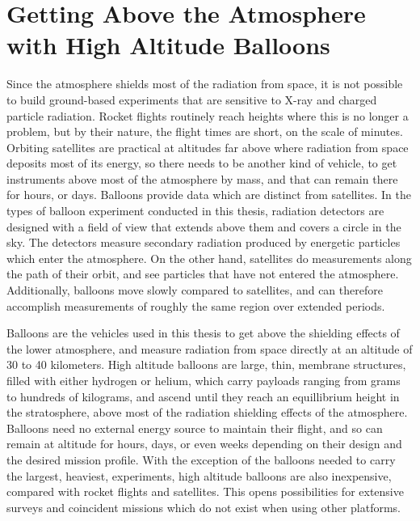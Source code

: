 \section{Getting Above the Atmosphere with High Altitude Balloons}

Since the atmosphere shields most of the radiation from space, it is not possible to build ground-based experiments that are sensitive to X-ray and charged particle radiation. Rocket flights routinely reach heights where this is no longer a problem, but by their nature, the flight times are short, on the scale of minutes. Orbiting satellites are practical at altitudes far above where radiation from space deposits most of its energy, so there needs to be another kind of vehicle, to get instruments above most of the atmosphere by mass, and that can remain there for hours, or days. Balloons provide data which are distinct from satellites. In the types of balloon experiment conducted in this thesis, radiation detectors are designed with a field of view that extends above them and covers a circle in the sky. The detectors measure secondary radiation produced by energetic particles which enter the atmosphere. On the other hand, satellites do measurements along the path of their orbit, and see particles that have not entered the atmosphere. Additionally, balloons move slowly compared to satellites, and can therefore accomplish measurements of roughly the same region over extended periods.  

Balloons are the vehicles used in this thesis to get above the shielding effects of the lower atmosphere, and measure radiation from space directly at an altitude of 30 to 40 kilometers. High altitude balloons are large, thin, membrane structures, filled with either hydrogen or helium, which carry payloads ranging from grams to hundreds of kilograms, and ascend until they reach an equillibrium height in the stratosphere, above most of the radiation shielding effects of the atmosphere. Balloons need no external energy source to maintain their flight, and so can remain at altitude for hours, days, or even weeks depending on their design and the desired mission profile. With the exception of the balloons needed to carry the largest, heaviest, experiments, high altitude balloons are also inexpensive, compared with rocket flights and satellites. This opens possibilities for extensive surveys and coincident missions which do not exist when using other platforms. 

